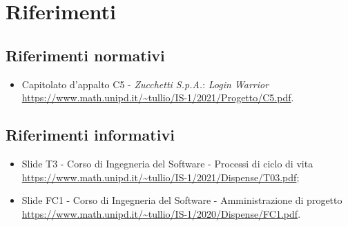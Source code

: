 \section{Riferimenti}
\subsection{Riferimenti normativi}
\begin{itemize}
  \item Capitolato d'appalto C5 - \textit{Zucchetti S.p.A.}: \textit{Login Warrior} \\
  \url{https://www.math.unipd.it/~tullio/IS-1/2021/Progetto/C5.pdf}.
\end{itemize}

\subsection{Riferimenti informativi}
\begin{itemize}
  \item Slide T3 - Corso di Ingegneria del Software - Processi di ciclo di vita \\
  \url{https://www.math.unipd.it/~tullio/IS-1/2021/Dispense/T03.pdf};
  \item Slide FC1 - Corso di Ingegneria del Software - Amministrazione di progetto \\
  \url{https://www.math.unipd.it/~tullio/IS-1/2020/Dispense/FC1.pdf}.
\end{itemize}
